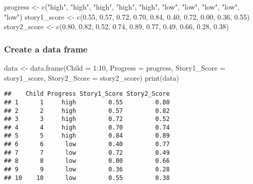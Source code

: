 \documentclass[
]{article}
\newenvironment{Shaded}{\begin{snugshade}}{\end{snugshade}}
\newcommand{\AttributeTok}[1]{\textcolor[rgb]{0.77,0.63,0.00}{#1}}
\newcommand{\DecValTok}[1]{\textcolor[rgb]{0.00,0.00,0.81}{#1}}
\newcommand{\FloatTok}[1]{\textcolor[rgb]{0.00,0.00,0.81}{#1}}
\newcommand{\FunctionTok}[1]{\textcolor[rgb]{0.00,0.00,0.00}{#1}}
\newcommand{\NormalTok}[1]{#1}
\newcommand{\OtherTok}[1]{\textcolor[rgb]{0.56,0.35,0.01}{#1}}
\newcommand{\SpecialCharTok}[1]{\textcolor[rgb]{0.00,0.00,0.00}{#1}}
\newcommand{\StringTok}[1]{\textcolor[rgb]{0.31,0.60,0.02}{#1}}
\begin{document}
\begin{Shaded}
\begin{Highlighting}[]
\NormalTok{progress }\OtherTok{\textless{}{-}} \FunctionTok{c}\NormalTok{(}\StringTok{"high"}\NormalTok{, }\StringTok{"high"}\NormalTok{, }\StringTok{"high"}\NormalTok{, }\StringTok{"high"}\NormalTok{, }\StringTok{"high"}\NormalTok{, }\StringTok{"low"}\NormalTok{, }\StringTok{"low"}\NormalTok{, }\StringTok{"low"}\NormalTok{, }\StringTok{"low"}\NormalTok{, }\StringTok{"low"}\NormalTok{)}
\NormalTok{story1\_score }\OtherTok{\textless{}{-}} \FunctionTok{c}\NormalTok{(}\FloatTok{0.55}\NormalTok{, }\FloatTok{0.57}\NormalTok{, }\FloatTok{0.72}\NormalTok{, }\FloatTok{0.70}\NormalTok{, }\FloatTok{0.84}\NormalTok{, }\FloatTok{0.40}\NormalTok{, }\FloatTok{0.72}\NormalTok{, }\FloatTok{0.00}\NormalTok{, }\FloatTok{0.36}\NormalTok{, }\FloatTok{0.55}\NormalTok{)}
\NormalTok{story2\_score }\OtherTok{\textless{}{-}} \FunctionTok{c}\NormalTok{(}\FloatTok{0.80}\NormalTok{, }\FloatTok{0.82}\NormalTok{, }\FloatTok{0.52}\NormalTok{, }\FloatTok{0.74}\NormalTok{, }\FloatTok{0.89}\NormalTok{, }\FloatTok{0.77}\NormalTok{, }\FloatTok{0.49}\NormalTok{, }\FloatTok{0.66}\NormalTok{, }\FloatTok{0.28}\NormalTok{, }\FloatTok{0.38}\NormalTok{)}
\end{Highlighting}
\end{Shaded}

\hypertarget{create-a-data-frame}{%
\subsubsection{Create a data frame}\label{create-a-data-frame}}

\begin{Shaded}
\begin{Highlighting}[]
\NormalTok{data }\OtherTok{\textless{}{-}} \FunctionTok{data.frame}\NormalTok{(}\AttributeTok{Child =} \DecValTok{1}\SpecialCharTok{:}\DecValTok{10}\NormalTok{, }\AttributeTok{Progress =}\NormalTok{ progress, }\AttributeTok{Story1\_Score =}\NormalTok{ story1\_score, }\AttributeTok{Story2\_Score =}\NormalTok{ story2\_score)}
\FunctionTok{print}\NormalTok{(data)}
\end{Highlighting}
\end{Shaded}

\begin{verbatim}
##    Child Progress Story1_Score Story2_Score
## 1      1     high         0.55         0.80
## 2      2     high         0.57         0.82
## 3      3     high         0.72         0.52
## 4      4     high         0.70         0.74
## 5      5     high         0.84         0.89
## 6      6      low         0.40         0.77
## 7      7      low         0.72         0.49
## 8      8      low         0.00         0.66
## 9      9      low         0.36         0.28
## 10    10      low         0.55         0.38
\end{verbatim}
\end{document}

